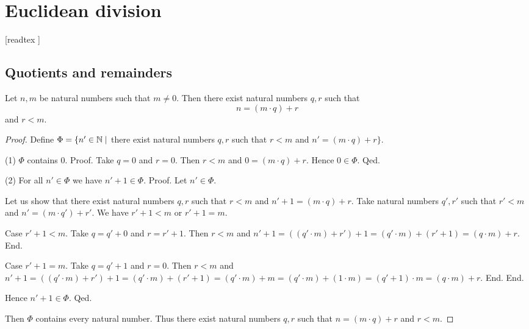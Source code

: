 \documentclass[../arithmetic.tex]{subfiles}
\begin{document}
  \chapter{Euclidean division}\label{chapter:euclidean-division}


  \begin{forthel}

    [readtex ]

  \end{forthel}


  \section{Quotients and remainders}

  \begin{forthel}
    \begin{theorem}
      Let $n, m$ be natural numbers such that $m \neq 0$.
      Then there exist natural numbers $q, r$ such that
      \[ n = (m \cdot q) + r \] and $r < m$.
    \end{theorem}
    \begin{proof}
      Define $\Phi = \{ n' \in \mathbb{N} \mid$ there exist natural numbers $q, r$
      such that $r < m$ and $n' = (m \cdot q) + r \}$.

      (1) $\Phi$ contains $0$.
      Proof.
        Take $q = 0$ and $r = 0$.
        Then $r < m$ and $0 = (m \cdot q) + r$.
        Hence $0 \in \Phi$.
      Qed.

      (2) For all $n' \in \Phi$ we have $n' + 1 \in \Phi$.
      Proof.
        Let $n' \in \Phi$.

        Let us show that there exist natural numbers $q, r$ such that $r < m$
        and $n' + 1 = (m \cdot q) + r$.
          Take natural numbers $q', r'$ such that $r' < m$ and
          $n' = (m \cdot q') + r'$.
          We have $r' + 1 < m$ or $r' + 1 = m$.

          Case $r' + 1 < m$.
            Take $q = q' + 0$ and $r = r' + 1$. %
            Then $r < m$ and $n' + 1
              = ((q' \cdot m) + r') + 1
              = (q' \cdot m) + (r' + 1)
              = (q \cdot m) + r$.
          End.

          Case $r' + 1 = m$.
            Take  $q = q' + 1$ and $r = 0$.
            Then $r < m$ and
            $n' + 1
              = ((q' \cdot m) + r') + 1
              = (q' \cdot m) + (r' + 1)
              = (q' \cdot m) + m
              = (q' \cdot m) + (1 \cdot m)
              = (q' + 1) \cdot m
              = (q \cdot m) + r$.
          End.
        End.

        Hence $n' + 1 \in \Phi$.
      Qed.

      Then $\Phi$ contains every natural number.
      Thus there exist natural numbers $q, r$ such that $n = (m \cdot q) + r$
      and $r < m$.
    \end{proof}
  \end{forthel}
\end{document}
